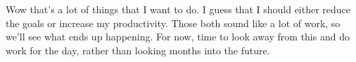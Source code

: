 \documentclass[12pt]{article}[titlepage]
\renewcommand{\,}{\textsuperscript{,}}
\begin{document}
Wow that's a lot of things that I want to do.
I guess that I should either reduce the goals or increase my productivity.
Those both sound like a lot of work, so we'll see what ends up happening.
For now, time to look away from this and do work for the day, rather than looking months into the future.
\end{document}
